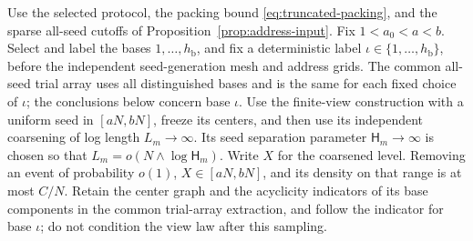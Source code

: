 \begin{lemma}
\label{lem:finite-view-input}
Use the selected protocol, the packing bound
\eqref{eq:truncated-packing}, and the sparse all-seed cutoffs of
Proposition~\ref{prop:address-input}.  Fix \(1<a_0<a<b\).
Select and label the bases \(1,\ldots,h_{\mathrm b}\), and fix a
deterministic label \(\iota\in\{1,\ldots,h_{\mathrm b}\}\), before the
independent seed-generation mesh and address grids.  The common all-seed
trial array uses all distinguished bases and is the same for each fixed
choice of \(\iota\); the conclusions below concern base \(\iota\).
Use the finite-view construction with a uniform
seed in \([aN,bN]\), freeze its centers, and then use its
independent coarsening of log length \(L_m\to\infty\).  Its seed
separation parameter \(\mathsf H_m\to\infty\) is chosen so that
\(L_m=o(N\wedge\log\mathsf H_m)\).
Write \(X\) for the coarsened level.  Removing an event of
probability \(o(1)\), \(X\in[aN,bN]\), and its density on that
range is at most \(C/N\).  Retain the center graph and the acyclicity
indicators of its base components in the common trial-array extraction,
and follow the indicator for base \(\iota\); do not condition the view
law after this sampling.


\end{lemma}
